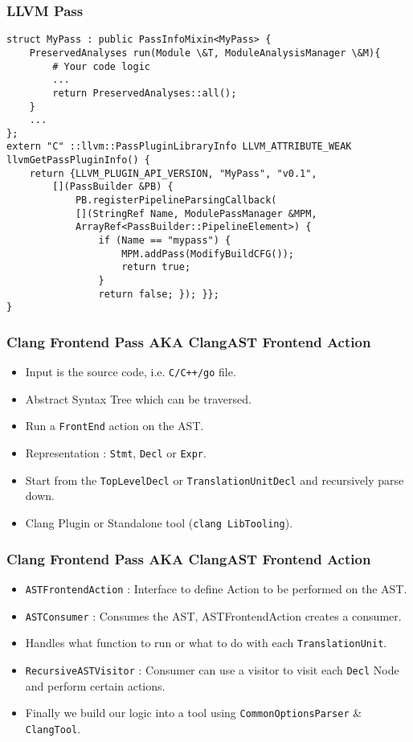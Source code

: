 \documentclass{beamer}
\begin{document}
\begin{frame}[fragile]
	\frametitle{LLVM Pass}
	\begin{verbatim}
struct MyPass : public PassInfoMixin<MyPass> {
	PreservedAnalyses run(Module \&T, ModuleAnalysisManager \&M){
		# Your code logic	
		...
		return PreservedAnalyses::all();
	}
	...
};
extern "C" ::llvm::PassPluginLibraryInfo LLVM_ATTRIBUTE_WEAK
llvmGetPassPluginInfo() {
	return {LLVM_PLUGIN_API_VERSION, "MyPass", "v0.1",
		[](PassBuilder &PB) {
			PB.registerPipelineParsingCallback(
			[](StringRef Name, ModulePassManager &MPM,
			ArrayRef<PassBuilder::PipelineElement>) {
				if (Name == "mypass") {
					MPM.addPass(ModifyBuildCFG());
					return true;
				}
				return false; }); }};
}
	\end{verbatim}
\end{frame}

\begin{frame}
	\frametitle{Clang Frontend Pass AKA ClangAST Frontend Action}
	\begin{itemize}
		\item Input is the source code, i.e. \texttt{C/C++/go} file. \pause
		\item Abstract Syntax Tree which can be traversed. \pause
		\item Run a \texttt{FrontEnd} action on the AST. \pause
		\item Representation : \texttt{Stmt}, \pause \texttt{Decl} \pause or \texttt{Expr}. \pause
		\item Start from the \texttt{TopLevelDecl} or \texttt{TranslationUnitDecl} \pause and recursively parse down. \pause
		\item Clang Plugin or Standalone tool (\texttt{clang LibTooling}).
	\end{itemize}
\end{frame}

\begin{frame}
	\frametitle{Clang Frontend Pass AKA ClangAST Frontend Action}
		\begin{itemize}
			\item \texttt{ASTFrontendAction} : Interface to define Action to be performed on the AST. \pause
			\item \texttt{ASTConsumer} : Consumes the AST, ASTFrontendAction creates a consumer. \pause
			\item Handles what function to run or what to do with each \texttt{TranslationUnit}. \pause
			\item \texttt{RecursiveASTVisitor} : Consumer can use a visitor to visit each \texttt{Decl} Node and perform certain actions. \pause
			\item Finally we build our logic into a tool using \texttt{CommonOptionsParser} \& \texttt{ClangTool}. \pause
		\end{itemize}
\end{frame}
\end{document}
